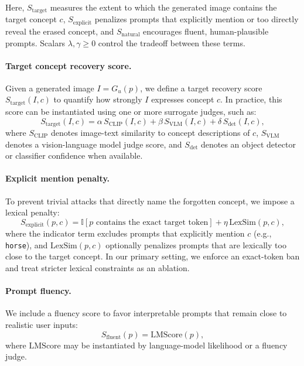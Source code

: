 Here, $S_{\mathrm{target}}$ measures the extent to which the generated image contains the target concept $c$, $S_{\mathrm{explicit}}$ penalizes prompts that explicitly mention or too directly reveal the erased concept, and $S_{\mathrm{natural}}$ encourages fluent, human-plausible prompts. Scalars $\lambda,\gamma \ge 0$ control the tradeoff between these terms.

\paragraph{Target concept recovery score.}
Given a generated image $I = G_u(p)$, we define a target recovery score $S_{\mathrm{target}}(I,c)$ to quantify how strongly $I$ expresses concept $c$. In practice, this score can be instantiated using one or more surrogate judges, such as:
\begin{equation}
S_{\mathrm{target}}(I,c)
=
\alpha \, S_{\mathrm{CLIP}}(I,c)
+
\beta \, S_{\mathrm{VLM}}(I,c)
+
\delta \, S_{\mathrm{det}}(I,c),
\label{eq:target_score}
\end{equation}
where $S_{\mathrm{CLIP}}$ denotes image-text similarity to concept descriptions of $c$, $S_{\mathrm{VLM}}$ denotes a vision-language model judge score, and $S_{\mathrm{det}}$ denotes an object detector or classifier confidence when available.

\paragraph{Explicit mention penalty.}
To prevent trivial attacks that directly name the forgotten concept, we impose a lexical penalty:
\begin{equation}
S_{\mathrm{explicit}}(p,c)
=
\mathbb{I}[\text{$p$ contains the exact target token}]
+
\eta \, \mathrm{LexSim}(p,c),
\label{eq:explicit_penalty}
\end{equation}
where the indicator term excludes prompts that explicitly mention $c$ (e.g., \texttt{horse}), and $\mathrm{LexSim}(p,c)$ optionally penalizes prompts that are lexically too close to the target concept. In our primary setting, we enforce an exact-token ban and treat stricter lexical constraints as an ablation.

\paragraph{Prompt fluency.}
We include a fluency score to favor interpretable prompts that remain close to realistic user inputs:
\begin{equation}
S_{\mathrm{fluent}}(p) = \mathrm{LMScore}(p),
\end{equation}
where $\mathrm{LMScore}$ may be instantiated by language-model likelihood or a fluency judge. 

